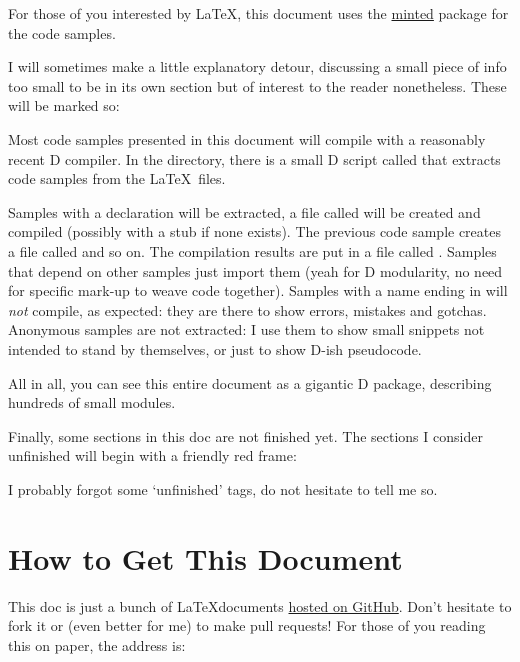 For those of you interested by \LaTeX, this document uses the \href{http://code.google.com/p/minted/}{minted} package for the code samples. 

I will sometimes make a little explanatory detour, discussing a small piece of info too small to be in its own section but of interest to the reader nonetheless. These will be marked so:

{Most code samples presented in this document will compile with a reasonably recent D compiler. In the  directory, there is a small D script called  that extracts code samples from the \LaTeX\ files.

Samples with a  declaration will be extracted, a file called  will be created and compiled (possibly with a stub  if none exists). The previous code sample creates a file called  and so on. The compilation results are put in a file called . Samples that depend on other samples just import them (yeah for D modularity, no need for specific mark-up to weave code together). Samples with a name ending in  will \emph{not} compile, as expected: they are there to show errors, mistakes and gotchas. Anonymous samples are not extracted: I use them to show small snippets not intended to stand by themselves, or just to show D-ish pseudocode.

All in all, you can see this entire document as a gigantic D package, describing hundreds of small modules.}

Finally, some sections in this doc are not finished yet. The sections I consider unfinished will begin with a friendly red frame:


I probably forgot some `unfinished' tags, do not hesitate to tell me so.

\section*{How to Get This Document}\label{howtoget}

This doc is just a bunch of \LaTeX documents \href{http://github.com/PhilippeSigaud/D-templates-tutorial}{hosted on GitHub}. Don't hesitate to fork it or (even better for me) to make pull requests! For those of you reading this on paper, the address is:

